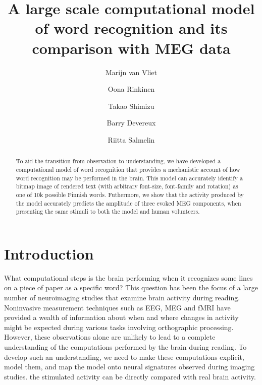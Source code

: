 \documentclass[a4paper, 10pt]{vanvliet_paper}
\title{A large scale computational model of word recognition and its comparison with MEG data}
\author[1*]{Marijn van Vliet}
\author[1]{Oona Rinkinen}
\author[1]{Takao Shimizu}
\author[2]{Barry Devereux}
\author[1]{Riitta Salmelin}
\affil[1]{Department of Neuroscience and Biomedical Engineering, Aalto University}
\affil[2]{School of Electronics, Electrical Engineering and Computer Science, Queen's University Belfast}
\affil[*]{Corresponding author: marijn.vanvliet@aalto.fi}
\begin{document}
\maketitle

\begin{abstract}
To aid the transition from observation to understanding, we have developed a computational model of word recognition that provides a mechanistic account of how word recognition may be performed in the brain.
This model can accurately identify a bitmap image of rendered text (with arbitrary font-size, font-family and rotation) as one of 10k possible Finnish words.
Futhermore, we show that the activity produced by the model accurately predicts the amplitude of three evoked \gls{MEG} components, when presenting the same stimuli to both the model and human volunteers.
\end{abstract}

\section{Introduction}

What computational steps is the brain performing when it recognizes some lines on a piece of paper as a specific word?
This question has been the focus of a large number of neuroimaging studies that examine brain activity during reading.
Noninvasive measurement techniques such as \gls{EEG}\cite{Grainger2009}, \gls{MEG}\cite{Salmelin2007} and \gls{fMRI}\cite{Price2012} have provided a wealth of information about when and where changes in activity might be expected during various tasks involving orthographic processing\cite{Carreiras2014}.
However, these observations alone are unlikely to lead to a complete understanding of the computations performed by the brain during reading\cite{Poeppel2012}.
To develop such an understanding, we need to make these computations explicit, model them, and map the model onto neural signatures observed during imaging studies\cite{Barber2007, Price2018}.
the stimulated activity can be directly compared with real brain activity.
\end{document}
